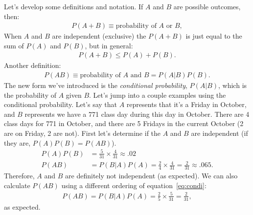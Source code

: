 \documentclass{article}
\begin{document}
\noindent Let's develop some definitions and notation. If $A$ and $B$ are possible outcomes, then:
\begin{align}
  P(A+B) \equiv \text{probability of }A\text{ or }B,
\end{align}
When $A$ and $B$ are independent (exclusive) the $P(A+B)$ is just equal to the sum of $P(A)$ and $P(B)$, but in general:
\begin{align*}
  P(A+B) \leq P(A) + P(B).
\end{align*}
Another definition:
\begin{align}
  P(AB) \equiv \text{probability of }A\text{ and } B = P(A|B)P(B).
  \label{eq:condi}
\end{align}
The new form we've introduced is the \emph{conditional probability}, $P(A|B)$, which is the probability of $A$ given $B$. Let's jump into a couple examples using the conditional probability. Let's say that $A$ represents that it's a Friday in October, and $B$ represents we have a 771 class day during this day in October. There are 4 class days for 771 in October, and there are 5 Fridays in the current October (2 are on Friday, 2 are not). First let's determine if the $A$ and $B$ are independent (if they are, $P(A)P(B)=P(AB)$).
\begin{align*}
  P(A)P(B) & = \frac{5}{31}\times\frac{4}{31} \approx .02 \\
  P(AB)    & = P(B|A)P(A) = \frac{2}{4}\times\frac{4}{31} = \frac{2}{31} \approx .065.
\end{align*}
Therefore, $A$ and $B$ are definitely not independent (as expected). We can also calculate $P(AB)$ using a different ordering of equation~\ref{eq:condi}:
\begin{align*}
  P(AB) = P(B|A)P(A) = \frac{2}{5}\times\frac{5}{31} = \frac{2}{31},
\end{align*}
as expected.
\end{document}

